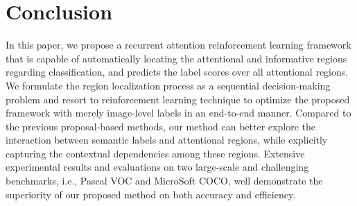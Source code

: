 \documentclass[letterpaper]{article} %
\begin{document}
\section{Conclusion}
In this paper, we propose a recurrent attention reinforcement learning framework that is capable of automatically locating the attentional and informative regions regarding classification, and predicts the label scores over all attentional regions. We formulate the region localization process as a sequential decision-making problem and resort to reinforcement learning technique to optimize the proposed framework with merely image-level labels in an end-to-end manner. Compared to the previous proposal-based methods, our method can better explore the interaction between semantic labels and attentional regions, while explicitly capturing the contextual dependencies among these regions. Extensive experimental results and evaluations on two large-scale and challenging benchmarks, i.e., Pascal VOC and MicroSoft COCO, well demonstrate the superiority of our proposed method on both accuracy and efficiency. 






\end{document}

